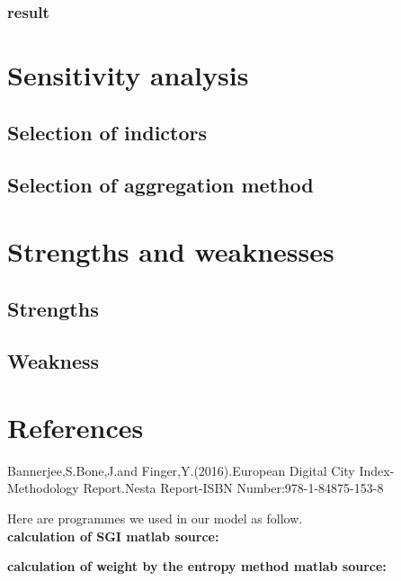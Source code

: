 \documentclass{mcmthesis}
\begin{document}
\subsubsection{result}

\section{Sensitivity analysis}
\subsection{Selection of indictors}%
\subsection{Selection of aggregation method}%
\section{Strengths and weaknesses}
\subsection{Strengths}%

\subsection{Weakness}%



\section{References}
\begin{thebibliography}{99}
Bannerjee,S.Bone,J.and Finger,Y.(2016).European Digital City Index-Methodology Report.Nesta Report-ISBN Number:978-1-84875-153-8
\end{thebibliography}

\begin{appendices}
Here are  programmes we used in our model as follow.\\
\textbf{\textcolor[rgb]{0.98,0.00,0.00}{calculation of SGI matlab source:}}

\textbf{\textcolor[rgb]{0.98,0.00,0.00}{calculation of weight by the entropy method matlab source:}}
\noindent{}
\end{appendices}
\end{document}
